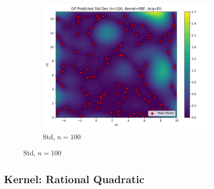 \documentclass[a4paper,12pt]{article}
\begin{document}
\begin{figure}[H]
\begin{subfigure}{0.3\textwidth}
    \includegraphics[width=\linewidth]{Task-02/images/gp_std_rbf_n100_EI.png}
    \caption{Std, $n=100$}
\end{subfigure}
\end{figure}

\subsection*{Kernel: Rational Quadratic}
\end{document}
